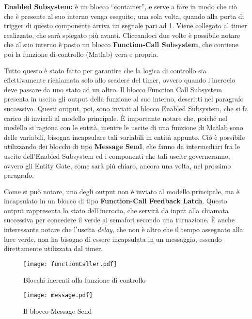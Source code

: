 \textbf{Enabled Subsystem\cite{enabledsub}:} è un blocco “container”, e serve a fare in modo che ciò che è presente al suo interno venga eseguito, una sola volta, quando alla porta di trigger di questo componente arriva un segnale pari ad 1. Viene collegato al timer realizzato, che sarà spiegato più avanti. Cliccandoci due volte è possibile notare che al suo interno è posto un blocco \textbf{Function-Call Subsystem\cite{functioncallsub}}, che contiene poi la funzione di controllo (Matlab) vera e propria.

Tutto questo è stato fatto per garantire che la logica di controllo sia effettivamente richiamata solo allo scadere del timer, ovvero quando l’incrocio deve passare da uno stato ad un altro. Il blocco Function Call Subsystem presenta in uscita gli output della funzione al suo interno, descritti nel paragrafo successivo. Questi output, poi, sono inviati al blocco Enabled Subsystem, che si fa carico di inviarli al modello principale. È importante notare che, poiché nel modello si ragiona con le entità, mentre le uscite di una funzione di Matlab sono delle variabili, bisogna incapsulare tali variabili in entità appunto. Ciò è possibile utilizzando dei blocchi di tipo \textbf{Message Send\cite{messagesend}}, che fanno da intermediari fra le uscite dell’Enabled Subsystem ed i componenti che tali uscite governeranno, ovvero gli Entity Gate, come sarà più chiaro, ancora una volta, nel prossimo paragrafo.

Come si può notare, uno degli output non è inviato al modello principale, ma è incapsulato in un blocco di tipo \textbf{Function-Call Feedback Latch\cite{feedbacklatch}}. Questo output rappresenta lo stato dell’incrocio, che servirà da input alla chiamata successiva per concedere il verde ai semafori secondo una turnazione. È anche interessante notare che l’uscita \textit{delay}, che non è altro che il tempo assegnato alla luce verde, non ha bisogno di essere incapsulata in un messaggio, essendo direttamente utilizzata dal timer.
\newline
\begin{figure}[H]
  \texttt{[image: functionCaller.pdf]}
  \caption{Blocchi inerenti alla funzione di controllo}
  \label{fig:blocchicontrollo}
\end{figure}
\begin{figure}[H]
\center
  \texttt{[image: message.pdf]}
  \caption{Il blocco Message Send}
  \label{fig:messagesend}
\end{figure}
\newpage

